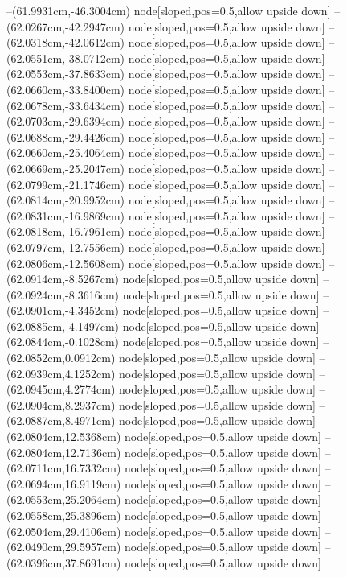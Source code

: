 --(61.9931cm,-46.3004cm) node[sloped,pos=0.5,allow upside down]{\arrowIn}
--(62.0267cm,-42.2947cm) node[sloped,pos=0.5,allow upside down]{\ArrowIn}
--(62.0318cm,-42.0612cm) node[sloped,pos=0.5,allow upside down]{\arrowIn}
--(62.0551cm,-38.0712cm) node[sloped,pos=0.5,allow upside down]{\ArrowIn}
--(62.0553cm,-37.8633cm) node[sloped,pos=0.5,allow upside down]{\arrowIn}
--(62.0660cm,-33.8400cm) node[sloped,pos=0.5,allow upside down]{\ArrowIn}
--(62.0678cm,-33.6434cm) node[sloped,pos=0.5,allow upside down]{\arrowIn}
--(62.0703cm,-29.6394cm) node[sloped,pos=0.5,allow upside down]{\ArrowIn}
--(62.0688cm,-29.4426cm) node[sloped,pos=0.5,allow upside down]{\arrowIn}
--(62.0660cm,-25.4064cm) node[sloped,pos=0.5,allow upside down]{\ArrowIn}
--(62.0669cm,-25.2047cm) node[sloped,pos=0.5,allow upside down]{\arrowIn}
--(62.0799cm,-21.1746cm) node[sloped,pos=0.5,allow upside down]{\ArrowIn}
--(62.0814cm,-20.9952cm) node[sloped,pos=0.5,allow upside down]{\arrowIn}
--(62.0831cm,-16.9869cm) node[sloped,pos=0.5,allow upside down]{\ArrowIn}
--(62.0818cm,-16.7961cm) node[sloped,pos=0.5,allow upside down]{\arrowIn}
--(62.0797cm,-12.7556cm) node[sloped,pos=0.5,allow upside down]{\ArrowIn}
--(62.0806cm,-12.5608cm) node[sloped,pos=0.5,allow upside down]{\arrowIn}
--(62.0914cm,-8.5267cm) node[sloped,pos=0.5,allow upside down]{\ArrowIn}
--(62.0924cm,-8.3616cm) node[sloped,pos=0.5,allow upside down]{\arrowIn}
--(62.0901cm,-4.3452cm) node[sloped,pos=0.5,allow upside down]{\ArrowIn}
--(62.0885cm,-4.1497cm) node[sloped,pos=0.5,allow upside down]{\arrowIn}
--(62.0844cm,-0.1028cm) node[sloped,pos=0.5,allow upside down]{\ArrowIn}
--(62.0852cm,0.0912cm) node[sloped,pos=0.5,allow upside down]{\arrowIn}
--(62.0939cm,4.1252cm) node[sloped,pos=0.5,allow upside down]{\ArrowIn}
--(62.0945cm,4.2774cm) node[sloped,pos=0.5,allow upside down]{\arrowIn}
--(62.0904cm,8.2937cm) node[sloped,pos=0.5,allow upside down]{\ArrowIn}
--(62.0887cm,8.4971cm) node[sloped,pos=0.5,allow upside down]{\arrowIn}
--(62.0804cm,12.5368cm) node[sloped,pos=0.5,allow upside down]{\ArrowIn}
--(62.0804cm,12.7136cm) node[sloped,pos=0.5,allow upside down]{\arrowIn}
--(62.0711cm,16.7332cm) node[sloped,pos=0.5,allow upside down]{\ArrowIn}
--(62.0694cm,16.9119cm) node[sloped,pos=0.5,allow upside down]{\arrowIn}
--(62.0553cm,25.2064cm) node[sloped,pos=0.5,allow upside down]{\ArrowIn}
--(62.0558cm,25.3896cm) node[sloped,pos=0.5,allow upside down]{\arrowIn}
--(62.0504cm,29.4106cm) node[sloped,pos=0.5,allow upside down]{\ArrowIn}
--(62.0490cm,29.5957cm) node[sloped,pos=0.5,allow upside down]{\arrowIn}
--(62.0396cm,37.8691cm) node[sloped,pos=0.5,allow upside down]{\ArrowIn}
